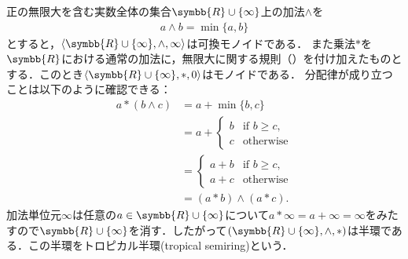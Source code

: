 \documentclass{ltjsbook}
\begin{document}
\begin{example} 正の無限大を含む実数全体の集合\(\symbb{R} \cup \{\infty\}\)上の加法\(\land\)を
\begin{align*}
    a \land b = \min \{a, b\}
\end{align*}
とすると，\(\langle \symbb{R} \cup \{\infty\}, \land, \infty\rangle\)は可換モノイドである．
また乗法\(\mathord{\ast}\)を\(\symbb{R}\)における通常の加法に，無限大に関する規則（）を付け加えたものとする．このとき\(\langle \symbb{R} \cup \{\infty\}, \mathord{\ast}, 0 \rangle\)はモノイドである．
分配律が成り立つことは以下のように確認できる：
\begin{align*}
    a \mathbin{\ast} (b \land c)
    &= a + \min \{b, c\} \\
    &= a +
    \begin{cases}
        b & \text{if \(b \geq c\),} \\
        c & \text{otherwise}
    \end{cases} \\
    &=
    \begin{cases}
        a + b  & \text{if \(b \geq c\),} \\
        a + c & \text{otherwise}
    \end{cases} \\
    &= (a \mathbin{\ast} b) \land (a \mathbin{\ast} c).
\end{align*}
    加法単位元\(\infty\)は任意の\(a \in \symbb{R} \cup \{\infty\}\)について\(a \mathbin{\ast} \infty = a + \infty = \infty\)をみたすので\(\symbb{R}\cup\{\infty\}\)を消す．したがって\(\tuple{ \symbb{R} \cup \{\infty\}, \mathord{\land}, \mathord{\ast} }\)は半環である．この半環をトロピカル半環(tropical semiring)という．
\end{example}

\begin{thmbox}
\begin{definition}[（ベクトル空間）]
\end{definition}
\end{thmbox}
\end{document}
